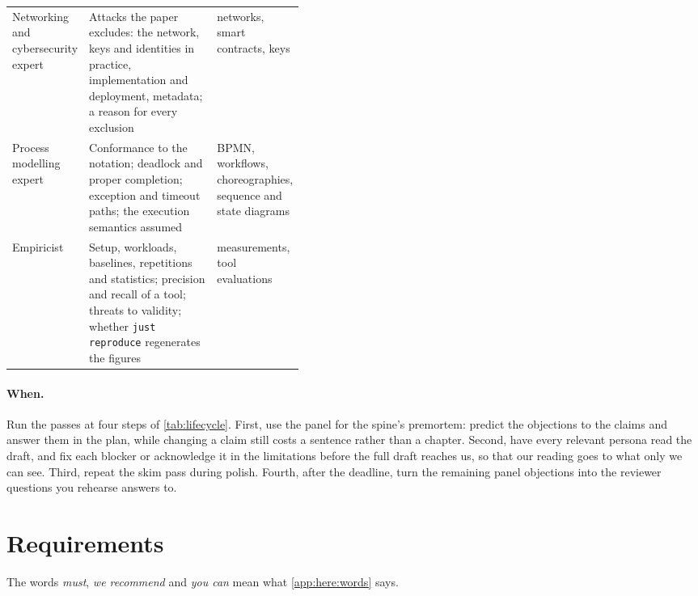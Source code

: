 {\begin{xltabular}{\linewidth}{>{\raggedright\arraybackslash}p{0.2\linewidth} X >{\raggedright\arraybackslash}p{0.22\linewidth}}
  Networking and cybersecurity expert & Attacks the paper excludes: the network, keys and identities in practice, implementation and deployment, metadata; a reason for every exclusion & networks, smart contracts, keys \\
  Process modelling expert & Conformance to the notation; deadlock and proper completion; exception and timeout paths; the execution semantics assumed & BPMN, workflows, choreographies, sequence and state diagrams \\
  Empiricist & Setup, workloads, baselines, repetitions and statistics; precision and recall of a tool; threats to validity; whether \texttt{just reproduce} regenerates the figures & measurements, tool evaluations \\
\end{xltabular}
}

\paragraph{When.}\label{app:lifecycle:when-passes} Run the passes at four steps of \cref{tab:lifecycle}. First, use the panel for the spine's premortem: predict the objections to the claims and answer them in the plan, while changing a claim still costs a sentence rather than a chapter. Second, have every relevant persona read the draft, and fix each blocker or acknowledge it in the limitations before the full draft reaches us, so that our reading goes to what only we can see. Third, repeat the skim pass during polish. Fourth, after the deadline, turn the remaining panel objections into the reviewer questions you rehearse answers to.

\section{Requirements}\label{app:lifecycle:polish}
The words \emph{must}, \emph{we recommend} and \emph{you can} mean what \cref{app:here:words} says.

